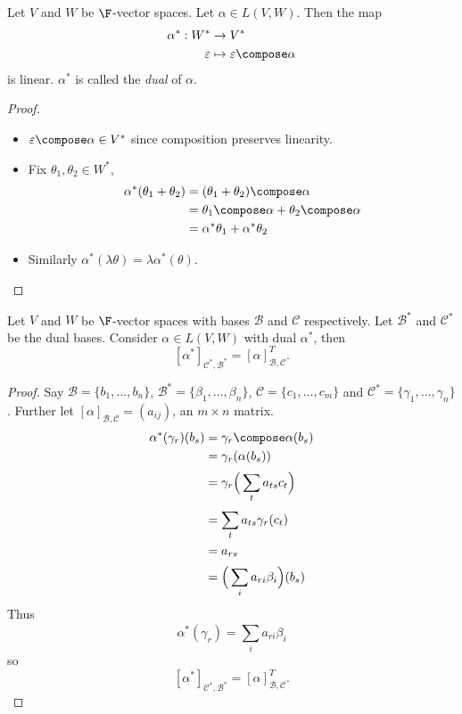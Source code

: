 \documentclass[a4paper]{article}
\newcommand*{\basis}{\mathcal}
\theoremstyle{definition}
\begin{document}
\begin{lemma}
  Let \(V\) and \(W\) be \(\F\)-vector spaces. Let \(\alpha \in L(V,W)\). Then the map
  \begin{align*}
    \alpha^*: W^* &\to V^* \\
    \varepsilon &\mapsto \varepsilon \compose \alpha
  \end{align*}
  is linear. \(\alpha^*\) is called the \emph{dual} of \(\alpha\).
\end{lemma}

\begin{proof}\leavevmode
  \begin{itemize}
  \item \(\varepsilon \compose \alpha \in V^*\) since composition preserves linearity.
  \item Fix \(\theta_1,\theta_2\in W^*\),
    \begin{align*}
      \alpha^*(\theta_1+\theta_2) &= (\theta_1+\theta_2)\compose \alpha \\
                                  &= \theta_1\compose \alpha + \theta_2 \compose \alpha \\
      &= \alpha^*\theta_1 + \alpha^*\theta_2
    \end{align*}
  \item Similarly \(\alpha^*(\lambda\theta) = \lambda\alpha^*(\theta)\).
  \end{itemize}
\end{proof}

\begin{proposition}
  Let \(V\) and \(W\) be \(\F\)-vector spaces with bases \(\basis B\) and \(\basis C\) respectively. Let \(\basis B^*\) and \(\basis C^*\) be the dual bases. Consider \(\alpha\in L(V,W)\) with dual \(\alpha^*\), then
  \[
    [\alpha^*]_{\basis C^*,\basis B^*} = [\alpha]^T_{\basis B,\basis C}.
  \]
\end{proposition}

\begin{proof}
  Say \(\basis B = \{b_1,\dots,b_n\}\), \(\basis B^* = \{\beta_1,\dots,\beta_n\}\), \(\basis C = \{c_1,\dots,c_m\}\) and \(\basis C^* = \{\gamma_1,\dots,\gamma_n\}\). Further let \([\alpha]_{\basis B,\basis C} = (a_{ij})\), an \(m\times n\) matrix.
  \begin{align*}
    \alpha^*(\gamma_r)(b_s) &= \gamma_r \compose \alpha(b_s) \\
                            &= \gamma_r(\alpha(b_s)) \\
                            &= \gamma_r \Big( \sum_{t}^{ }a_{ts}c_t \Big) \\
                            &= \sum_{t}^{ } a_{ts} \gamma_r(c_t) \\
                            &= a_{rs} \\
                            &= \Big( \sum_{i}^{ } a_{ri}\beta_i \Big) (b_s)
  \end{align*}
  Thus
  \[
    \alpha^*(\gamma_r) = \sum_{i}^{ } a_{ri}\beta_i
  \]
  so
  \[
    [\alpha^*]_{\basis C^*,\basis B^*} = [\alpha]^T_{\basis B,\basis C}.
  \]
\end{proof}
\end{document}
